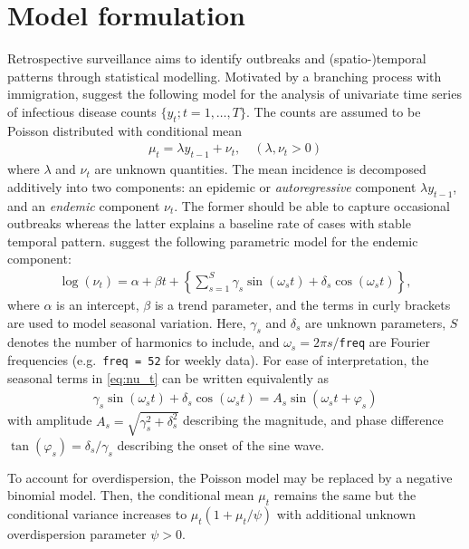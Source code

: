 \documentclass[a4paper,11pt]{article}
\newcommand{\code}[1]{\texttt{#1}}
\begin{document}
\section{Model formulation}\label{sec:model}

Retrospective surveillance aims to identify outbreaks and (spatio-)temporal
patterns through statistical modelling. Motivated by a branching process
with immigration, \cite{held-etal-2005} suggest the following model
for the analysis of univariate time series of infectious disease counts 
$\{y_{t}; t=1,\ldots,T\}$.
The counts are assumed to be Poisson distributed with conditional mean
\begin{align*}
  \mu_{t} = \lambda y_{t-1}+ \nu_{t}, \quad(\lambda,\nu_{t}>0)
\end{align*}
where $\lambda$ and $\nu_t$ are unknown quantities.
The mean incidence is decomposed additively into two components: an
epidemic or \emph{autoregressive} component $\lambda y_{t-1}$, and
an \emph{endemic} component $\nu_t$. The former should be able to capture
occasional outbreaks whereas the latter explains a baseline rate of cases
with stable temporal pattern. 
\cite{held-etal-2005} suggest the following parametric model for the endemic 
component:
\begin{align}\label{eq:nu_t}
  \log(\nu_t) =\alpha + \beta t +
              \left\{\sum_{s=1}^S \gamma_s \sin(\omega_s t) + \delta_s \cos(\omega_s t)\right\},
\end{align}
where $\alpha$ is an intercept, $\beta$ is a trend parameter, and the terms
in curly brackets are used to model seasonal variation. Here, $\gamma_s$ and
$\delta_s$ are unknown parameters, $S$ denotes the number of harmonics to 
include, and $\omega_s=2\pi s/$\code{freq} are Fourier frequencies (e.g.\
\code{freq = 52} for weekly data).
For ease of interpretation, the seasonal terms in \eqref{eq:nu_t} can be
written equivalently as 
\begin{align*}
 \gamma_s \sin(\omega_s t) + \delta_s \cos(\omega_s t)= A_s \sin(\omega_s t +\varphi_s)
\end{align*}
with amplitude $A_s=\sqrt{\gamma_s^2+\delta_s^2}$
describing the magnitude, and phase difference $\tan(\varphi_s)=\delta_s/\gamma_s$ 
describing the onset of the sine wave.

To account for overdispersion, the Poisson model may be replaced by
a negative binomial model. Then, the conditional mean $\mu_t$ remains
the same but the conditional variance increases to $\mu_t (1+\mu_t/\psi)$
with additional unknown overdispersion parameter $\psi>0$.
\end{document}
